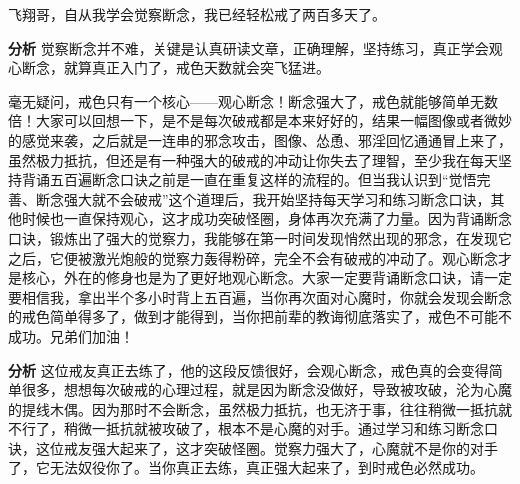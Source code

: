 \begin{case}
    飞翔哥，自从我学会觉察断念，我已经轻松戒了两百多天了。

    \textbf{分析} 觉察断念并不难，关键是认真研读文章，正确理解，坚持练习，真正学会观心断念，就算真正入门了，戒色天数就会突飞猛进。
\end{case}

\begin{case}
    毫无疑问，戒色只有一个核心——观心断念！断念强大了，戒色就能够简单无数倍！大家可以回想一下，是不是每次破戒都是本来好好的，结果一幅图像或者微妙的感觉来袭，之后就是一连串的邪念攻击，图像、怂恿、邪淫回忆通通冒上来了，虽然极力抵抗，但还是有一种强大的破戒的冲动让你失去了理智，至少我在每天坚持背诵五百遍断念口诀之前是一直在重复这样的流程的。但当我认识到“觉悟完善、断念强大就不会破戒”这个道理后，我开始坚持每天学习和练习断念口诀，其他时候也一直保持观心，这才成功突破怪圈，身体再次充满了力量。因为背诵断念口诀，锻炼出了强大的觉察力，我能够在第一时间发现悄然出现的邪念，在发现它之后，它便被激光炮般的觉察力轰得粉碎，完全不会有破戒的冲动了。观心断念才是核心，外在的修身也是为了更好地观心断念。大家一定要背诵断念口诀，请一定要相信我，拿出半个多小时背上五百遍，当你再次面对心魔时，你就会发现会断念的戒色简单得多了，做到才能得到，当你把前辈的教诲彻底落实了，戒色不可能不成功。兄弟们加油！

    \textbf{分析} 这位戒友真正去练了，他的这段反馈很好，会观心断念，戒色真的会变得简单很多，想想每次破戒的心理过程，就是因为断念没做好，导致被攻破，沦为心魔的提线木偶。因为那时不会断念，虽然极力抵抗，也无济于事，往往稍微一抵抗就不行了，稍微一抵抗就被攻破了，根本不是心魔的对手。通过学习和练习断念口诀，这位戒友强大起来了，这才突破怪圈。觉察力强大了，心魔就不是你的对手了，它无法奴役你了。当你真正去练，真正强大起来了，到时戒色必然成功。
\end{case}

